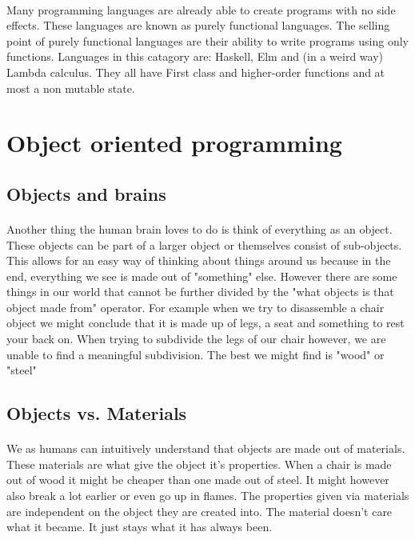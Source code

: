 \documentclass{scrartcl}
\begin{document}
    \paragraph{}
    Many programming languages are already able to create programs with no
    side effects. These languages are known as purely functional languages. 
    The selling point of purely functional languages are their ability to 
    write programs using only functions. Languages in this catagory are:
    Haskell, Elm and (in a weird way) Lambda calculus. They all have First
    class and higher-order functions and at most a non mutable state.
    \newpage 

    \section{Object oriented programming}
    \subsection{Objects and brains}
    \paragraph{}
    Another thing the human brain loves to do is think of everything as an object.
    These objects can be part of a larger object or themselves consist of sub-objects.
    This allows for an easy way of thinking about things around us because in the
    end, everything we see is made out of "something" else. However there are some things
    in our world that cannot be further divided by the "what objects is that object made from"
    operator. For example when we try to disassemble a chair object we might conclude that
    it is made up of legs, a seat and something to rest your back on. When trying to 
    subdivide the legs of our chair however, we are unable to find a meaningful subdivision.
    The best we might find is "wood" or "steel"

    \subsection{Objects vs. Materials}
    \paragraph{}
    We as humans can intuitively understand that objects are made out of materials.
    These materials are what give the object it's properties. When a chair is made out
    of wood it might be cheaper than one made out of steel. It might however also break 
    a lot earlier or even go up in flames. The properties given via materials are
    independent on the object they are created into. The material doesn't care what it
    became. It just stays what it has always been.
\end{document}
